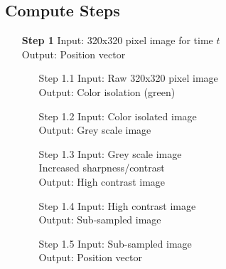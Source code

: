 \documentclass[stu,12pt,floatsintext]{apa7}
\begin{document}
\subsection{Compute Steps}
\begin{enumerate}
    \item[\textbf{Step 1}] Input: 320x320 pixel image for time $t$\\
    Output: Position vector\\
    \item[]
    \begin{enumerate}
        \item[Step 1.1] Input: Raw 320x320 pixel image\\
        Output: Color isolation (green)\\
        \item[Step 1.2] Input: Color isolated image\\
        Output: Grey scale image\\
        \item[Step 1.3] Input: Grey scale image\\
        Increased sharpness/contrast\\
        Output: High contrast image\\
        \item[Step 1.4] Input: High contrast image\\
        Output: Sub-sampled image\\
        \item[Step 1.5] Input: Sub-sampled image\\
        Output: Position vector\\
    \end{enumerate}


\end{enumerate}
\end{document}
